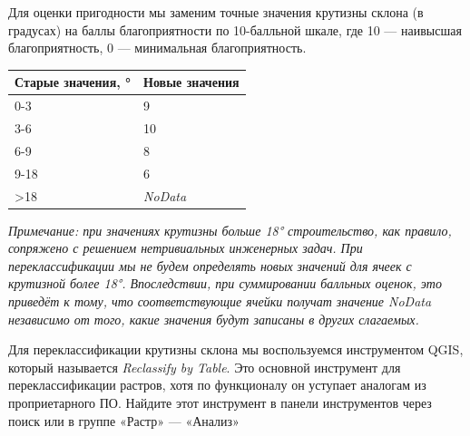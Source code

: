 \documentclass[
  12pt,
]{book}
\begin{document}
Для оценки пригодности мы заменим точные значения крутизны склона (в градусах) на баллы благоприятности по 10-балльной шкале, где 10 --- наивысшая благоприятность, 0 --- минимальная благоприятность.

\begin{longtable}[]{@{}ll@{}}
\toprule
Старые значения, ° & Новые значения\tabularnewline
\midrule
\endhead
0-3 & 9\tabularnewline
3-6 & 10\tabularnewline
6-9 & 8\tabularnewline
9-18 & 6\tabularnewline
\textgreater18 & \emph{NoData}\tabularnewline
\bottomrule
\end{longtable}

\emph{Примечание: при значениях крутизны больше 18° строительство, как правило, сопряжено с решением нетривиальных инженерных задач. При переклассификации мы не будем определять новых значений для ячеек с крутизной более 18°. Впоследствии, при суммировании балльных оценок, это приведёт к тому, что соответствующие ячейки получат значение NoData независимо от того, какие значения будут записаны в других слагаемых.}

Для переклассификации крутизны склона мы воспользуемся инструментом QGIS, который называется \emph{Reclassify by Table}. Это основной инструмент для переклассификации растров, хотя по функционалу он уступает аналогам из проприетарного ПО. Найдите этот инструмент в панели инструментов через поиск или в группе «Растр» --- «Анализ»
\end{document}
